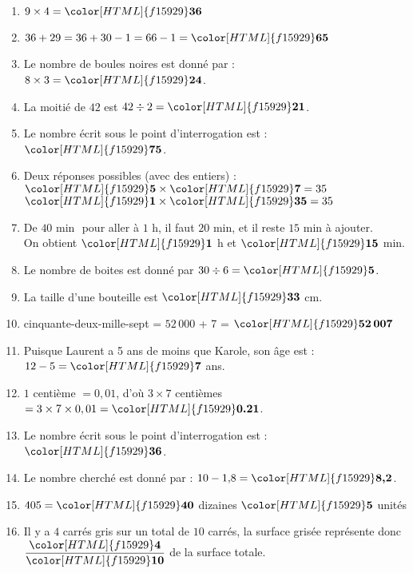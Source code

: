 \begin{Correction}
\begin{EXO}{}{}
\begin{enumerate}[itemsep=1em, label=\arabic*)]
\item $9 \times 4={\color[HTML]{f15929}\boldsymbol{36}}$
\item $36+29=36+30-1=66-1={\color[HTML]{f15929}\boldsymbol{65}}$
\item Le nombre de boules noires est donné par : $8\times 3={\color[HTML]{f15929}\boldsymbol{24}}$.
\item La moitié de $42$ est $42\div 2={\color[HTML]{f15929}\boldsymbol{21}}$.
\item Le nombre écrit sous le point d'interrogation est : ${\color[HTML]{f15929}\boldsymbol{75}}$.
\item Deux réponses possibles (avec des entiers) : \\
        ${\color[HTML]{f15929}\boldsymbol{5}}\times {\color[HTML]{f15929}\boldsymbol{7}}=35$\\
        ${\color[HTML]{f15929}\boldsymbol{1}}\times {\color[HTML]{f15929}\boldsymbol{35}}=35$ 
\item De $40 \text{ min }$ pour aller à $1$ h, il faut $20$ min, et il reste $15$ min à ajouter.\\
        On obtient  ${\color[HTML]{f15929}\boldsymbol{1}}$ h et ${\color[HTML]{f15929}\boldsymbol{15}}$ min.
\item Le nombre de boites est donné par $30\div 6={\color[HTML]{f15929}\boldsymbol{5}}$.
\item La taille d'une bouteille est ${\color[HTML]{f15929}\boldsymbol{33}}$ cm.
\item cinquante-deux-mille-sept = $52\,000$ + 7 = ${\color[HTML]{f15929}\boldsymbol{52\,007}}$ 
\item Puisque Laurent a 5 ans de moins que Karole, son âge est  : $12-5={\color[HTML]{f15929}\boldsymbol{7}}$ {\color[HTML]{f15929}ans}. 
\item $1$ centième $=0,01$, d'où $3\times 7$ centièmes $=3\times 7\times 0,01={\color[HTML]{f15929}\boldsymbol{0.21}}$.
\item Le nombre écrit sous le point d'interrogation est : ${\color[HTML]{f15929}\boldsymbol{36}}$.
\item Le nombre cherché est donné par : $10-1{,}8={\color[HTML]{f15929}\boldsymbol{8{,}2}}$.
\item $405 = {\color[HTML]{f15929}\boldsymbol{40}}$ dizaines ${\color[HTML]{f15929}\boldsymbol{5}}$ unités
\item Il y a $4$ carrés gris sur un total de $10$ carrés, la surface grisée représente donc $\dfrac{{\color[HTML]{f15929}\boldsymbol{4}}}{{\color[HTML]{f15929}\boldsymbol{10}}}$ de la surface totale.

\end{enumerate}
\end{EXO}
\end{Correction}
